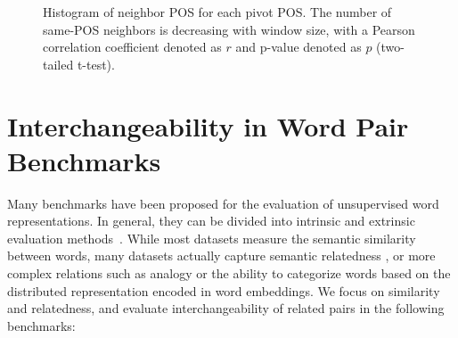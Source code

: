 \documentclass[11pt,a4paper]{article}
\begin{document}
{\begin{figure*}[ht]
	    \caption{Histogram of neighbor POS for each pivot POS.
	    The number of same-POS neighbors is decreasing with window size,
	    with a Pearson correlation coefficient denoted as $r$
	    and p-value denoted as $p$ (two-tailed t-test).
	    \label{fig:nn_pos_hist}}
	\end{figure*}




    
    
    \section{Interchangeability in Word Pair Benchmarks}\label{sec:benchmarks}

    Many benchmarks have been proposed for the evaluation of unsupervised word
    representations.
    In general, they can be divided into intrinsic and extrinsic evaluation methods~\cite{schnabel2015evaluation,jastrzebski2017evaluate,alshargi2018concept2vec,bakarov2018survey,chiu2016intrinsic}.
    While most datasets measure the semantic similarity between words,
    many datasets actually capture semantic relatedness
    \cite{hill2015simlex,avraham2016improving},
    or more complex relations such as analogy or the ability to categorize
    words based on the distributed representation encoded in word embeddings.
    We focus on similarity and relatedness, and evaluate interchangeability
    of related pairs in the following benchmarks:
    
}
\end{document}
